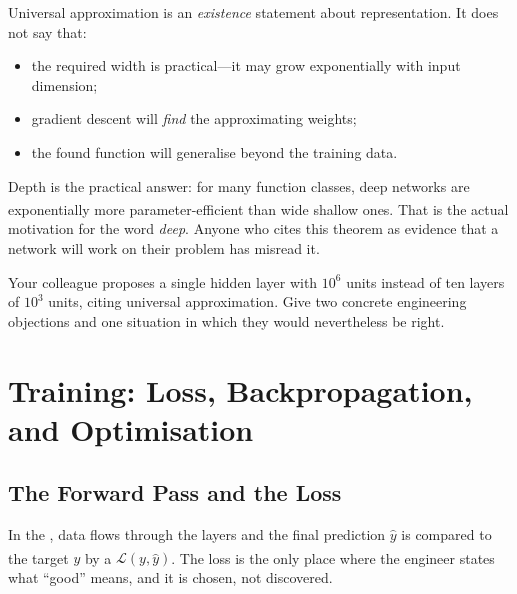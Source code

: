 \begin{cautionbox}
Universal approximation is an \emph{existence} statement about representation.
It does not say that:
\begin{itemize}
  \item the required width is practical---it may grow exponentially with input
        dimension;
  \item gradient descent will \emph{find} the approximating weights;
  \item the found function will generalise beyond the training data.
\end{itemize}
Depth is the practical answer: for many function classes, deep networks are
exponentially more parameter-efficient than wide shallow
ones\textsuperscript{\cite[][pp.~8--12]{robertsPrinciplesDeepLearning2022}}.
That is the actual motivation for the word \emph{deep}. Anyone who cites this
theorem as evidence that a network will work on their problem has misread it.
\end{cautionbox}

\begin{checkpoint}
Your colleague proposes a single hidden layer with $10^6$ units instead of ten
layers of $10^3$ units, citing universal approximation. Give two concrete
engineering objections and one situation in which they would nevertheless be
right.
\end{checkpoint}

\section{Training: Loss, Backpropagation, and Optimisation}
\label{sec:dl-backprop}

\subsection{The Forward Pass and the Loss}

In the , data flows through the layers and the final
prediction $\hat y$ is compared to the target $y$ by a 
$\mathcal{L}(y,\hat y)$\textsuperscript{\cite[][pp.~20--22]{fleuretLittleBookDeep}}.
The loss is the only place where the engineer states what ``good'' means, and
it is chosen, not discovered.

